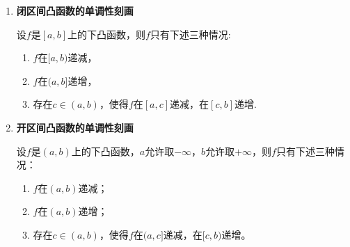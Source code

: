 \documentclass[lang=cn,newtx,10pt,scheme=chinese]{elegantbook}
\begin{document}
\begin{proposition}[下凸函数的单调性刻画]\label{proposition:下凸函数的单调性刻画}
\begin{enumerate}
\item \textbf{闭区间凸函数的单调性刻画}

设\(f\)是\([a,b]\)上的下凸函数，则\(f\)只有下述三种情况:
\begin{enumerate}[(1)]
\item \(f\)在\([a,b)\)递减，

\item \(f\)在\((a,b]\)递增，

\item 存在\(c\in(a,b)\)，使得\(f\)在\([a,c]\)递减，在\([c,b]\)递增.
\end{enumerate}

\item \textbf{开区间凸函数的单调性刻画}

设\(f\)是\((a,b)\)上的下凸函数，\(a\)允许取\(-\infty\)，\(b\)允许取\(+\infty\)，则\(f\)只有下述三种情况：
\begin{enumerate}[(1)]
\item \(f\)在\((a,b)\)递减；
\item \(f\)在\((a,b)\)递增；
\item 存在\(c\in(a,b)\)，使得\(f\)在\((a,c]\)递减，在\([c,b)\)递增。
\end{enumerate}
\end{enumerate}
\end{proposition}
\end{document}
